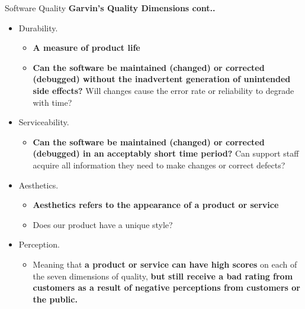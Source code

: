 \documentclass{beamer}
\begin{document}
\begin{frame}{Software Quality}
	\textbf{Garvin’s Quality Dimensions cont.. }
	\begin{itemize}
		\item Durability. 
		\begin{itemize}
			\item \textbf{A measure of product life}
			\item \textbf{Can the software be maintained (changed) or corrected (debugged) without the inadvertent generation of unintended side effects?} Will changes cause the error rate or reliability to degrade with time?
		\end{itemize}
		\item Serviceability. 
	\begin{itemize}
		\item \textbf{Can the software be maintained (changed) or corrected (debugged) in an acceptably short time period?} Can support staff acquire all information they need to make changes or correct defects? 
		
	\end{itemize}
	\item Aesthetics. 
\begin{itemize}
	\item \textbf{Aesthetics refers to the appearance of a product or service}
	\item Does our product have a unique style?
	
\end{itemize}
\item Perception. 
\begin{itemize}
	\item Meaning that \textbf{a product or service can have high scores} on each of the seven dimensions of quality,\textbf{ but still receive a bad rating from customers as a result of negative perceptions from customers or the public.}
\end{itemize}
	\end{itemize}
\end{frame}
\end{document}
